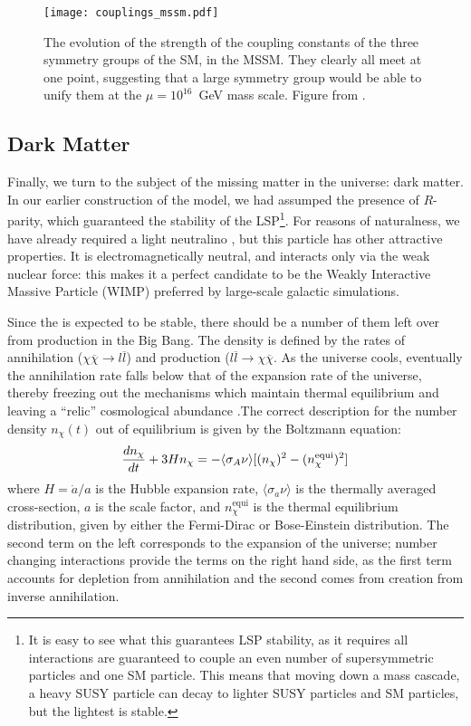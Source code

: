 
\begin{figure}
\centering
\texttt{[image: couplings\_mssm.pdf]}
\label{fig:susy:couplings_mssm}
\caption{The evolution of the strength of the coupling constants of the three symmetry groups of the SM, in the MSSM. They clearly all meet at one point, suggesting that a large symmetry group would be able to unify them at the $\mu = 10^{16}$~GeV mass scale. Figure from \cite{susypheno}.}
\end{figure}


\subsection{Dark Matter}

Finally, we turn to the subject of the missing matter in the universe: dark matter. In our earlier construction of the model, we had assumped the presence of $R$-parity, which guaranteed the stability of the LSP\footnote{It is easy to see what this guarantees LSP stability, as it requires all interactions are guaranteed to couple an even number of supersymmetric particles and one SM particle. This means that moving down a mass cascade, a heavy SUSY particle can decay to lighter SUSY particles and SM particles, but the lightest is stable.}. For reasons of naturalness, we have already required a light neutralino \lsp, but this particle has other attractive properties. It is electromagnetically neutral, and interacts only via the weak nuclear force: this makes it a perfect candidate to be the Weakly Interactive Massive Particle (WIMP) preferred by large-scale galactic simulations.  

Since the \lsp is expected to be stable, there should be a number of them left over from production in the Big Bang. The density is defined by the rates of annihilation ($\chi\overline{\chi} \rightarrow l \overline{l}$) and production ($l\overline{l}\rightarrow \chi\overline{\chi}$. As the universe cools, eventually the annihilation rate falls below that of the expansion rate of the universe, thereby freezing out the mechanisms which maintain thermal equilibrium and leaving a ``relic'' cosmological abundance \cite{Jungman}.The correct description for the number density $n_\chi(t)$ out of equilibrium is given by the Boltzmann equation:
\begin{align}
  \frac{d n_\chi}{d t} + 3 H n_\chi = - \langle \sigma_A \nu \rangle [(n_\chi)^2 - (n_\chi^\mathrm{equi})^2]\label{eqn:boltz}
\end{align}
where $H=\dot{a}/a$ is the Hubble expansion rate, $\langle\sigma_a \nu\rangle$ is the thermally averaged cross-section, $a$ is the scale factor, and $n_\chi^\mathrm{equi}$ is the thermal equilibrium distribution, given by either the Fermi-Dirac or Bose-Einstein distribution. The second term on the left corresponds to the expansion of the universe; number changing interactions provide the terms on the right hand side, as the first term accounts for depletion from annihilation and the second comes from creation from inverse annihilation. 

